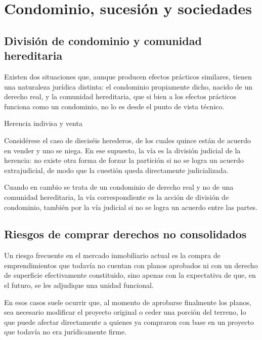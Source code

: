 \documentclass[12pt,oneside]{book}
\begin{document}

\chapter{Condominio, sucesión y sociedades}

\section{División de condominio y comunidad hereditaria}

Existen dos situaciones que, aunque producen efectos prácticos similares, tienen una naturaleza jurídica distinta: el condominio propiamente dicho, nacido de un derecho real, y la comunidad hereditaria, que si bien a los efectos prácticos funciona como un condominio, no lo es desde el punto de vista técnico.

\begin{example}{Herencia indivisa y venta}

Considérese el caso de dieciséis herederos, de los cuales quince están de acuerdo en vender y uno se niega. En ese supuesto, la vía es la división judicial de la herencia: no existe otra forma de forzar la partición si no se logra un acuerdo extrajudicial, de modo que la cuestión queda directamente judicializada.

Cuando en cambio se trata de un condominio de derecho real y no de una comunidad hereditaria, la vía correspondiente es la acción de división de condominio, también por la vía judicial si no se logra un acuerdo entre las partes.

\end{example}

\section{Riesgos de comprar derechos no consolidados}

Un riesgo frecuente en el mercado inmobiliario actual es la compra de emprendimientos que todavía no cuentan con planos aprobados ni con un derecho de superficie efectivamente constituido, sino apenas con la expectativa de que, en el futuro, se les adjudique una unidad funcional.

\begin{important}
En esos casos suele ocurrir que, al momento de aprobarse finalmente los planos, sea necesario modificar el proyecto original o ceder una porción del terreno, lo que puede afectar directamente a quienes ya compraron con base en un proyecto que todavía no era jurídicamente firme.
\end{important}
\end{document}
